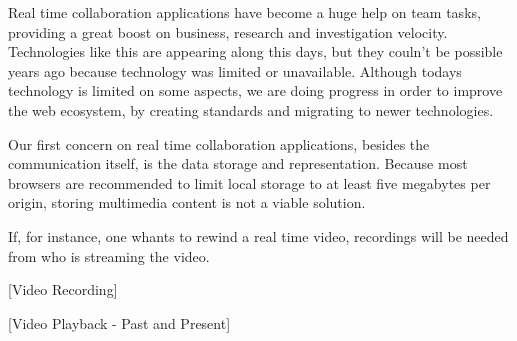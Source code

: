
  Real time collaboration applications have become a huge help on team tasks, providing a great boost on business, research and investigation velocity. Technologies like this are appearing along this days, but they couln't be possible years ago because technology was limited or unavailable. Although todays technology is limited on some aspects, we are doing progress in order to improve the web ecosystem, by creating standards and migrating to newer technologies.

  Our first concern on real time collaboration applications, besides the communication itself, is the data storage and representation. Because most browsers are recommended to limit local storage to at least five megabytes per origin, storing multimedia content is not a viable solution.

  If, for instance, one whants to rewind a real time video, recordings will be needed from who is streaming the video. 

  {\color{red}[Video Recording]}

  {\color{red}[Video Playback - Past and Present]}
